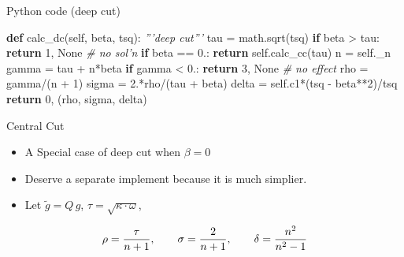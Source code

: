 \documentclass[10pt,ignorenonframetext,serif,onlymath]{beamer}
\newenvironment{Shaded}{}{}
\newcommand{\CommentTok}[1]{\textcolor[rgb]{0.38,0.63,0.69}{\textit{#1}}}
\newcommand{\ControlFlowTok}[1]{\textcolor[rgb]{0.00,0.44,0.13}{\textbf{#1}}}
\newcommand{\DecValTok}[1]{\textcolor[rgb]{0.25,0.63,0.44}{#1}}
\newcommand{\FloatTok}[1]{\textcolor[rgb]{0.25,0.63,0.44}{#1}}
\newcommand{\KeywordTok}[1]{\textcolor[rgb]{0.00,0.44,0.13}{\textbf{#1}}}
\newcommand{\NormalTok}[1]{#1}
\newcommand{\OperatorTok}[1]{\textcolor[rgb]{0.40,0.40,0.40}{#1}}
\newcommand{\VariableTok}[1]{\textcolor[rgb]{0.10,0.09,0.49}{#1}}
\providecommand{\tightlist}{%
  \setlength{\itemsep}{0pt}\setlength{\parskip}{0pt}}
\begin{document}
\begin{frame}[fragile]{Python code (deep cut)}
\protect\hypertarget{python-code-deep-cut}{}

\begin{Shaded}
\begin{Highlighting}[]
\KeywordTok{def}\NormalTok{ calc_dc(}\VariableTok{self}\NormalTok{, beta, tsq):}
    \CommentTok{'''deep cut'''}
\NormalTok{    tau }\OperatorTok{=}\NormalTok{ math.sqrt(tsq)}
    \ControlFlowTok{if}\NormalTok{ beta }\OperatorTok{>}\NormalTok{ tau:}
        \ControlFlowTok{return} \DecValTok{1}\NormalTok{, }\VariableTok{None}    \CommentTok{# no sol'n}
    \ControlFlowTok{if}\NormalTok{ beta }\OperatorTok{==} \FloatTok{0.}\NormalTok{:}
        \ControlFlowTok{return} \VariableTok{self}\NormalTok{.calc_cc(tau)}
\NormalTok{    n }\OperatorTok{=} \VariableTok{self}\NormalTok{._n}
\NormalTok{    gamma }\OperatorTok{=}\NormalTok{ tau }\OperatorTok{+}\NormalTok{ n}\OperatorTok{*}\NormalTok{beta}
    \ControlFlowTok{if}\NormalTok{ gamma }\OperatorTok{<} \FloatTok{0.}\NormalTok{:}
        \ControlFlowTok{return} \DecValTok{3}\NormalTok{, }\VariableTok{None}  \CommentTok{# no effect}
\NormalTok{    rho }\OperatorTok{=}\NormalTok{ gamma}\OperatorTok{/}\NormalTok{(n }\OperatorTok{+} \DecValTok{1}\NormalTok{)}
\NormalTok{    sigma }\OperatorTok{=} \FloatTok{2.}\OperatorTok{*}\NormalTok{rho}\OperatorTok{/}\NormalTok{(tau }\OperatorTok{+}\NormalTok{ beta)}
\NormalTok{    delta }\OperatorTok{=} \VariableTok{self}\NormalTok{.c1}\OperatorTok{*}\NormalTok{(tsq }\OperatorTok{-}\NormalTok{ beta}\OperatorTok{**}\DecValTok{2}\NormalTok{)}\OperatorTok{/}\NormalTok{tsq}
    \ControlFlowTok{return} \DecValTok{0}\NormalTok{, (rho, sigma, delta)}
\end{Highlighting}
\end{Shaded}

\end{frame}

\begin{frame}{Central Cut}
\protect\hypertarget{central-cut}{}

\begin{itemize}
\tightlist
\item
  A Special case of deep cut when \(\beta = 0\)
\item
  Deserve a separate implement because it is much simplier.
\item
  Let \(\tilde{g} = Q\,g\), \(\tau = \sqrt{\kappa\cdot\omega}\),
\end{itemize}

\[\rho = {\tau \over n+1}, \qquad
  \sigma = {2 \over n+1}, \qquad
  \delta = {n^2 \over n^2 - 1}\]

\end{frame}
\end{document}
